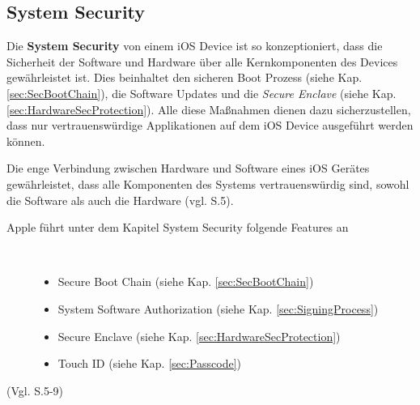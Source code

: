 \subsection{System Security}
\label{sec:SystemSec}
Die \textbf{System Security} von einem iOS Device ist so kon­zep­ti­o­nie­rt, dass die Sicherheit der Software und Hardware über alle Kernkomponenten des Devices gewährleistet ist. Dies beinhaltet den sicheren Boot Prozess (siehe Kap. \ref{sec:SecBootChain}), die Software Updates und die \textit{\glqq Secure Enclave\grqq{}} (siehe Kap. \ref{sec:HardwareSecProtection}). Alle diese Maßnahmen dienen dazu sicherzustellen, dass nur vertrauenswürdige Applikationen auf dem iOS Device ausgeführt werden können.\par 

Die enge Verbindung zwischen Hardware und Software eines iOS Gerätes gewährleistet, dass alle Komponenten des Systems vertrauenswürdig sind, sowohl die Software als auch die Hardware (vgl. \cite{Apple[4]} S.5).

\begin{description}
\item[Apple führt unter dem Kapitel System Security folgende Features an]~\par
	\begin{itemize}
		\item Secure Boot Chain (siehe Kap. \ref{sec:SecBootChain})
 		\item System Software Authorization (siehe Kap. \ref{sec:SigningProcess})
 		\item Secure Enclave (siehe Kap. \ref{sec:HardwareSecProtection})
 		\item Touch ID (siehe Kap. \ref{sec:Passcode})
        \end{itemize}
\end{description}
(Vgl. \cite{Apple[4]} S.5-9)
